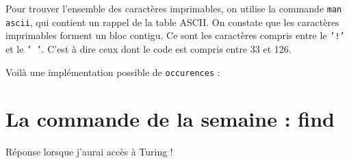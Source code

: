 \documentclass[10pt]{article}
\begin{document}
\begin{enumerate}[label=\textbf{[\alph*]}]
\item Pour trouver l'ensemble des caractères imprimables, on utilise
  la commande \texttt{man ascii}, qui contient un rappel de la table
  ASCII. On constate que les caractères imprimables forment un bloc
  contigu. Ce sont les caractères compris entre le \texttt{'!'} et le
  \texttt{'~'}. C'est à dire ceux dont le code est compris entre 33 et
  126.

  Voilà une implémentation possible de \texttt{occurences} :

  \vspace{0.5cm}
  


  \newpage
  \section{La commande de la semaine : find}

\item Réponse lorsque j'aurai accès à Turing !

\end{enumerate}
\end{document}
